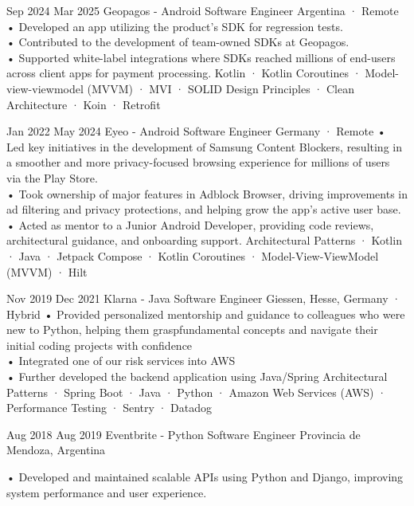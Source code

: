 \documentclass[a4paper,nocolors]{friggeri-cv}
\begin{document}
\begin{entrylist}


\entryexperience
{Sep 2024}
{Mar 2025}
{Geopagos - Android Software Engineer}
{Argentina · Remote}
{
• Developed an app utilizing the product's SDK for regression tests.\\
• Contributed to the development of team-owned SDKs at Geopagos.\\
• Supported white-label integrations where SDKs reached millions of end-users across client apps for payment processing.
}
{
  Kotlin · Kotlin Coroutines · Model-view-viewmodel (MVVM) · MVI · SOLID Design Principles · Clean Architecture · Koin · Retrofit
}


\entryexperience
{Jan 2022}
{May 2024}
{Eyeo - Android Software Engineer}
{Germany · Remote}
{
• Led key initiatives in the development of Samsung Content Blockers, resulting in a smoother and more privacy-focused browsing experience for millions of users via the Play Store.
\\
• Took ownership of major features in Adblock Browser, driving improvements in ad filtering and privacy protections, and helping grow the app’s active user base.
\\
• Acted as mentor to a Junior Android Developer, providing code reviews, architectural guidance, and onboarding support.
}
{
  Architectural Patterns · Kotlin · Java · Jetpack Compose · Kotlin Coroutines · Model-View-ViewModel (MVVM) · Hilt
}


\entryexperience
{Nov 2019}
{Dec 2021}
{Klarna - Java Software Engineer}
{Giessen, Hesse, Germany · Hybrid}
{
  • Provided personalized mentorship and guidance to colleagues who were new to Python, helping them graspfundamental concepts and navigate their initial coding projects with confidence
  \\
  • Integrated one of our risk services into AWS
  \\
  • Further developed the backend application using Java/Spring
}
{ 
  Architectural Patterns · Spring Boot  · Java · Python · Amazon Web Services (AWS) · Performance Testing · Sentry · Datadog
}


\entryexperience
{Aug 2018}
{Aug 2019}
{Eventbrite - Python Software Engineer}
{Provincia de Mendoza, Argentina}
{
  • Developed and maintained scalable APIs using Python and Django, improving system performance and user experience.

}
\end{entrylist}
\end{document}
